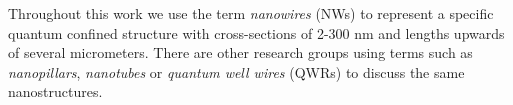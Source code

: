 Throughout this work we use the term  {\em nanowires} (NWs) to represent a
specific quantum confined structure with cross-sections of 2-300 nm and lengths
upwards of several micrometers. There are other research groups using terms
such as {\em nanopillars}, {\em nanotubes} or {\em quantum well wires} (QWRs)
to discuss the same nanostructures.
